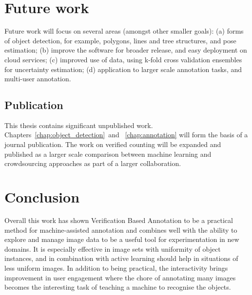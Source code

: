 \section{Future work}

Future work will focus on several areas (amongst other smaller goals): (a) forms of object detection, for example, polygons, lines and tree structures, and pose estimation; (b) improve the software for broader release, and easy deployment on cloud services; (c) improved use of data, using k-fold cross validation ensembles for uncertainty estimation; (d) application to larger scale annotation tasks, and multi-user annotation.

\subsection{Publication}
 
This thesis contains significant unpublished work. Chapters~\ref{chap:object_detection}~and ~\ref{chap:annotation} will form the basis of a journal publication. The work on verified counting will be expanded and published as a larger scale comparison between machine learning and crowdsourcing approaches as part of a larger collaboration.

\section{Conclusion}

Overall this work has shown Verification Based Annotation to be a practical method for machine-assisted annotation and combines well with the ability to explore and manage image data to be a useful tool for experimentation in new domains. It is especially effective in image sets with uniformity of object instances, and in combination with active learning should help in situations of less uniform images. In addition to being practical, the interactivity brings improvement in user engagement where the chore of annotating many images becomes the interesting task of teaching a machine to recognise the objects.


